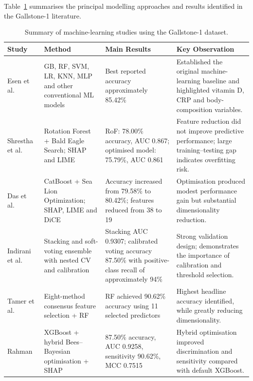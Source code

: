 Table~\ref{tab:gallstone_literature} summarises the principal modelling approaches and results identified in the Gallstone-1 literature.

\begin{table}[htbp]
\centering
\caption{Summary of machine-learning studies using the Gallstone-1 dataset.}
\label{tab:gallstone_literature}
\small
\begin{tabular}{p{2.6cm} p{3.4cm} p{4.6cm} p{4.1cm}}
\hline
\textbf{Study} & \textbf{Method} & \textbf{Main Results} & \textbf{Key Observation} \\
\hline

Esen et al.~\cite{esen2024early}
&
GB, RF, SVM, LR, KNN, MLP and other conventional ML models
&
Best reported accuracy approximately 85.42\%
&
Established the original machine-learning baseline and highlighted vitamin D, CRP and body-composition variables.
\\[0.2cm]

Shrestha et al.~\cite{shrestha2026metaheuristic}
&
Rotation Forest + Bald Eagle Search; SHAP and LIME
&
RoF: 78.00\% accuracy, AUC 0.867; optimised model: 75.79\%, AUC 0.861
&
Feature reduction did not improve predictive performance; large training--testing gap indicates overfitting risk.
\\[0.2cm]

Das et al.~\cite{das2026sloa}
&
CatBoost + Sea Lion Optimization; SHAP, LIME and DiCE
&
Accuracy increased from 79.58\% to 80.42\%; features reduced from 38 to 19
&
Optimisation produced modest performance gain but substantial dimensionality reduction.
\\[0.2cm]

Indirani et al.~\cite{indirani2026ensemble}
&
Stacking and soft-voting ensemble with nested CV and calibration
&
Stacking AUC 0.9307; calibrated voting accuracy 87.50\% with positive-class recall of approximately 94\%
&
Strong validation design; demonstrates the importance of calibration and threshold selection.
\\[0.2cm]

Tamer et al.~\cite{tamer2026novel}
&
Eight-method consensus feature selection + RF
&
RF achieved 90.62\% accuracy using 11 selected predictors
&
Highest headline accuracy identified, while greatly reducing dimensionality.
\\[0.2cm]

Rahman~\cite{rahman2026hbb}
&
XGBoost + hybrid Bees--Bayesian optimisation + SHAP
&
87.50\% accuracy, AUC 0.9258, sensitivity 90.62\%, MCC 0.7515
&
Hybrid optimisation improved discrimination and sensitivity compared with default XGBoost.
\\

\hline
\end{tabular}
\end{table}

